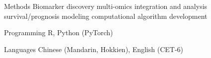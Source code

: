 

\begin{cvskills}
  \cvskill
    {Methods}
    {Biomarker discovery \textbullet{} multi-omics integration and analysis \textbullet{} survival/prognosis modeling \textbullet{} computational algorithm development}

  \cvskill
    {Programming}
    {R, Python (PyTorch)}

  \cvskill
    {Languages}
    {Chinese (Mandarin, Hokkien), English (CET-6)}
\end{cvskills}
